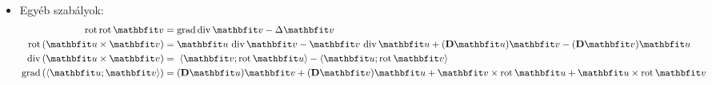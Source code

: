 \begin{blueBox}[][nobreak]
\begin{itemize}
    \item Egyéb szabályok:
          \vspace{-.5em}
          \begin{align*}
            \rot \rot \rvec v
             & =\grad \Div \rvec v
            - \Delta \rvec v
            \\
            \rot \left( \rvec u \times \rvec v \right)
             & = \rvec u \, \Div \rvec v
            - \rvec v \, \Div \rvec u
            + (\DD \rvec u) \rvec v
            - (\DD \rvec v) \rvec u
            \\
            \Div \left( \rvec u \times \rvec v \right)
             & = \; \scalar{\rvec v}{\rot \rvec u}
            - \scalar{\rvec u}{\rot \rvec v}
            \\
            \grad \left( \scalar{\rvec u}{\rvec v} \right)
             & = (\DD \rvec u) \rvec v
            + (\DD \rvec v) \rvec u
            + \rvec v \times \rot \rvec u
            + \rvec u \times \rot \rvec v
          \end{align*}
  \end{itemize}
\end{blueBox}

